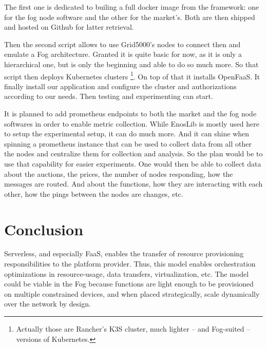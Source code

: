 \documentclass[11pt]{sdm}
\begin{document}
The first one is dedicated to builing a full docker image from the framework: one for the fog node software and the other for the market's. Both are then shipped and hosted on Github for latter retrieval.

Then the second script allows to use Grid5000's nodes to connect then and emulate a Fog architecture. Granted it is quite basic for now, as it is only a hierarchical one, but is only the beginning and able to do so much more. So that script then deploys Kubernetes clusters \footnote{Actually those are Rancher's K3S cluster, much lighter – and Fog-suited – versions of Kubernetes. }. On top of that it installs OpenFaaS. It finally install our application and configure the cluster and authorizations according to our needs. Then testing and experimenting can start.

It is planned to add prometheus endpoints to both the market and the fog node softwares in order to enable metric collection. While EnosLib is mostly used here to setup the experimental setup, it can do much more. And it can shine when spinning a prometheus instance that can be used to collect data from all other the nodes and centralize them for collection and analysis. So the plan would be to use that capability for easier experiments. One would then be able to collect data about the auctions, the prices, the number of nodes responding, how the messages are routed. And about the functions, how they are interacting with each other,  how the pings between the nodes are changes, etc.


\section{Conclusion}

Serverless, and especially \gls{FaaS}, enables the transfer of resource provisioning responsibilities to the platform provider. Thus, this model enables orchestration optimizations in resource-usage, data transfers, virtualization, etc. The model could be viable in the Fog because functions are light enough to be provisioned on multiple constrained devices, and when placed strategically, scale dynamically over the network by design.
\end{document}
